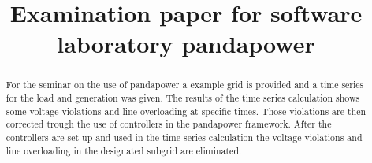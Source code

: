 \documentclass[conference]{IEEEtran}
\begin{document}
\title{Examination paper for software laboratory pandapower}

\author{
}

\maketitle

\begin{abstract}
For the seminar on the use of pandapower a example grid is provided and a time series for the load and generation was given. The results of the time series calculation shows some voltage violations and line overloading at specific times. Those violations are then corrected trough the use of controllers in the pandapower framework. After the controllers are set up and used in the time series calculation the voltage violations and line overloading in the designated subgrid are eliminated.
\end{abstract}
\end{document}
